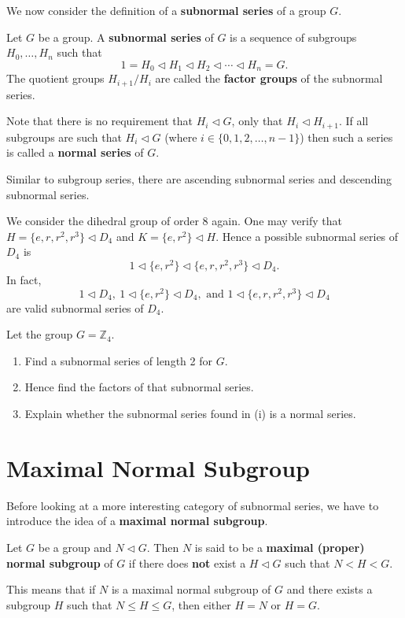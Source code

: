 We now consider the definition of a \textbf{subnormal series} of a group $G$.
\begin{definition}
    Let $G$ be a group. A \textbf{subnormal series} of $G$ is a sequence of subgroups $H_0, \dots, H_n$ such that
    \[
        1 = H_0 \lhd H_1 \lhd H_2 \lhd \cdots \lhd H_n = G.    
    \]
    The quotient groups $H_{i+1}/H_i$ are called the \textbf{factor groups} of the subnormal series.
\end{definition}
\begin{remark}
    Note that there is no requirement that $H_i \lhd G$, only that $H_i \lhd H_{i+1}$. If all subgroups are such that $H_i \lhd G$ (where $i \in \{0, 1, 2, \dots, n-1\}$) then such a series is called a \textbf{normal series} of $G$.
\end{remark}
\begin{remark}
    Similar to subgroup series, there are ascending subnormal series and descending subnormal series.
\end{remark}

\begin{example}
    We consider the dihedral group of order 8 again. One may verify that $H = \{e, r, r^2, r^3\} \lhd D_4$ and $K = \{e, r^2\} \lhd H$. Hence a possible subnormal series of $D_4$ is
    \[
        1 \lhd \{e, r^2\} \lhd \{e, r, r^2, r^3\} \lhd D_4.
    \]
    In fact,
    \[
        1 \lhd D_4, \ 1 \lhd \{e, r^2\} \lhd D_4, \text{ and } 1 \lhd \{e, r, r^2, r^3\} \lhd D_4
    \]
    are valid subnormal series of $D_4$.
\end{example}

\begin{exercise}
    Let the group $G = \mathbb{Z}_4$.
    \begin{enumerate}[label=(\roman*)]
        \item Find a subnormal series of length 2 for $G$.
        \item Hence find the factors of that subnormal series.
        \item Explain whether the subnormal series found in (i) is a normal series.
    \end{enumerate}
\end{exercise}

\section{Maximal Normal Subgroup}
Before looking at a more interesting category of subnormal series, we have to introduce the idea of a \textbf{maximal normal subgroup}.
\begin{definition}
    Let $G$ be a group and $N \lhd G$. Then $N$ is said to be a \textbf{maximal (proper) normal subgroup} of $G$ if there does \textbf{not} exist a $H \lhd G$ such that $N < H < G$.
\end{definition}
\begin{remark}
    This means that if $N$ is a maximal normal subgroup of $G$ and there exists a subgroup $H$ such that $N \leq H \leq G$, then either $H = N$ or $H = G$.
\end{remark}

